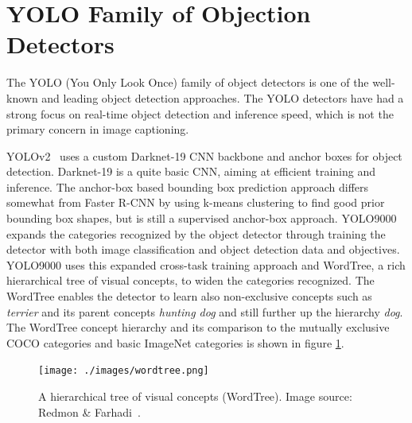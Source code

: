 \documentclass[english,twoside,openright]{HYgraduMLDS}
\begin{document}
\section{YOLO Family of Objection Detectors}
\label{section:YOLO_ObjectDetection}
The YOLO (You Only Look Once) family of object detectors is one of the well-known and leading object detection approaches. The YOLO detectors have had a strong focus on real-time object detection and inference speed, which is not the primary concern in image captioning.

YOLOv2~\cite{YOLO9000} uses a custom Darknet-19 CNN backbone and anchor boxes for object detection. Darknet-19 is a quite basic CNN, aiming at efficient training and inference. The anchor-box based bounding box prediction approach differs somewhat from Faster R-CNN by using k-means clustering to find good prior bounding box shapes, but is still a supervised anchor-box approach. YOLO9000~\cite{YOLO9000} expands the categories recognized by the object detector through training the detector with both image classification and object detection data and objectives. YOLO9000 uses this expanded cross-task training approach and WordTree, a rich hierarchical tree of visual concepts, to widen the categories recognized. The WordTree enables the detector to learn also non-exclusive concepts such as \textit{terrier} and its parent concepts \textit{hunting dog} and still further up the hierarchy \textit{dog}. The WordTree concept hierarchy and its comparison to the mutually exclusive COCO categories and basic ImageNet categories is shown in figure \ref{fig:wordtree-labels}.

\begin{figure}[h] 
\centering
\texttt{[image: ./images/wordtree.png]}
\caption{A hierarchical tree of visual concepts (WordTree). Image source: Redmon \& Farhadi~\cite{YOLO9000}.}
\label{fig:wordtree-labels} 
\end{figure}
\end{document}
